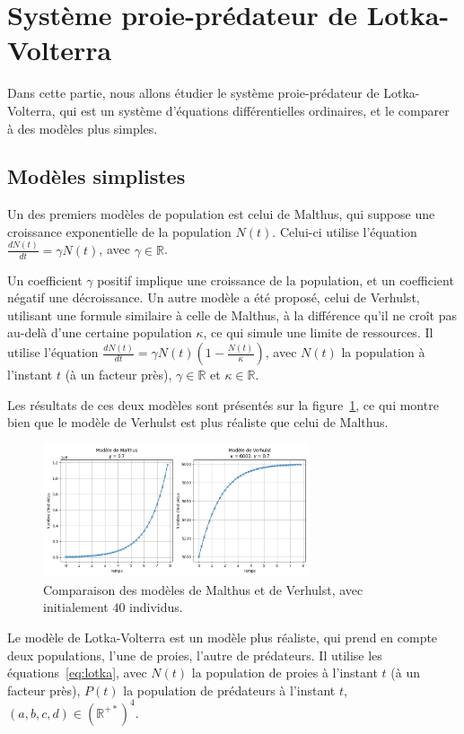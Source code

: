 \section{Système proie-prédateur de Lotka-Volterra}\label{sec:sec2}
Dans cette partie, nous allons étudier le système proie-prédateur de Lotka-Volterra,
qui est un système d'équations différentielles ordinaires,
et le comparer à des modèles plus simples.


\subsection{Modèles simplistes}
Un des premiers modèles de population est celui de Malthus, qui suppose une croissance exponentielle de la population $N(t)$.
Celui-ci utilise l'équation $\frac{dN(t)}{dt} = \gamma N(t)$, avec $\gamma \in \mathbb{R}$.

Un coefficient $\gamma$ positif implique une croissance de la population, et un coefficient négatif une décroissance.
Un autre modèle a été proposé, celui de Verhulst, utilisant une formule similaire à celle de Malthus,
à la différence qu'il ne croît pas au-delà d'une certaine population $\kappa$, ce qui simule une limite de ressources.
Il utilise l'équation $\frac{dN(t)}{dt} = \gamma N(t) \left( 1 - \frac{N(t)}{\kappa} \right)$,
avec $N(t)$ la population à l'instant $t$ (à un facteur près), $\gamma \in \mathbb{R}$ et $\kappa \in \mathbb{R}$.

Les résultats de ces deux modèles sont présentés sur la figure~\ref{fig:populations}, ce qui montre bien que le modèle de Verhulst
est plus réaliste que celui de Malthus.

\begin{figure}[htbp!]
	\centering
	\includegraphics[width=0.7\textwidth]{res/population}
	\caption{Comparaison des modèles de Malthus et de Verhulst, avec initialement $40$ individus.}
	\label{fig:populations}
\end{figure}

Le modèle de Lotka-Volterra est un modèle plus réaliste, qui prend en compte deux populations,
l'une de proies, l'autre de prédateurs.
Il utilise les équations~\ref{eq:lotka}, avec $N(t)$ la population de proies à l'instant $t$ (à un facteur près),
$P(t)$ la population de prédateurs à l'instant $t$, $(a, b, c, d) \in (\mathbb{R}^{+*})^4$.


